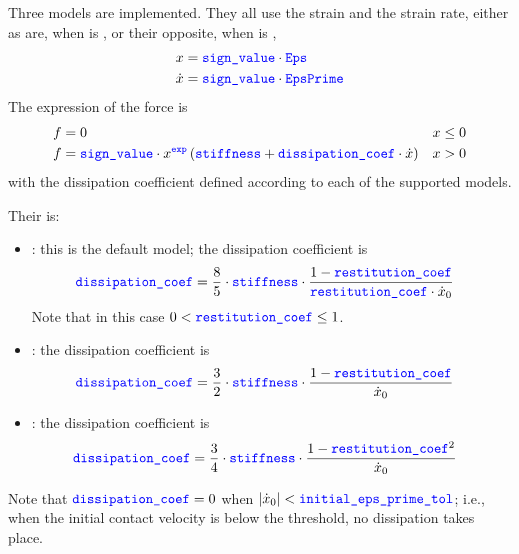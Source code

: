 Three models are implemented. They all use the strain and the strain rate, either as are, when  is ,
or their opposite, when  is ,
\begin{subequations}
\begin{align}
	x &= \textcolor{blue}{\texttt{sign\_value}} \cdot \textcolor{blue}{\texttt{Eps}}
	\\
	\dot{x} &= \textcolor{blue}{\texttt{sign\_value}} \cdot \textcolor{blue}{\texttt{EpsPrime}}
\end{align}
\end{subequations}
The expression of the force is
\begin{subequations}
\begin{align}
	f &= 0 && \text{$x \le 0$}
	\\
	f &= \textcolor{blue}{\texttt{sign\_value}} \cdot  x^{\textcolor{blue}{\texttt{exp}}} \left(  \textcolor{blue}{\texttt{stiffness}} + \textcolor{blue}{\texttt{dissipation\_coef}} \cdot \dot{x} \right) && \text{$x > 0$}
\end{align}
\end{subequations}
with the dissipation coefficient  defined according to each of the supported models.

Their  is:
\begin{itemize}
\item {} \cite{FLORES-2011-MUBO}: this is the default model; the dissipation coefficient is
\begin{align}
	\textcolor{blue}{\texttt{dissipation\_coef}} &= \frac{8}{5} \cdot \textcolor{blue}{\texttt{stiffness}} \cdot \frac{1 - \textcolor{blue}{\texttt{restitution\_coef}}}{\textcolor{blue}{\texttt{restitution\_coef}} \cdot \dot{x}_0}
\end{align}
Note that in this case $0 < \textcolor{blue}{\texttt{restitution\_coef}} \le 1$.

\item {} \cite{HUNT-1975}: the dissipation coefficient is
\begin{align}
	\textcolor{blue}{\texttt{dissipation\_coef}} &= \frac{3}{2} \cdot \textcolor{blue}{\texttt{stiffness}} \cdot \frac{1 - \textcolor{blue}{\texttt{restitution\_coef}}}{\dot{x}_0}
\end{align}

\item {} \cite{LANKARANI-1994-ND}: the dissipation coefficient is
\begin{align}
	\textcolor{blue}{\texttt{dissipation\_coef}} &= \frac{3}{4} \cdot \textcolor{blue}{\texttt{stiffness}} \cdot \frac{1 - \textcolor{blue}{\texttt{restitution\_coef}}^2}{\dot{x}_0}
\end{align}
\end{itemize}
Note that $\textcolor{blue}{\texttt{dissipation\_coef}} = 0$ when $|\dot{x}_0| < \textcolor{blue}{\texttt{initial\_eps\_prime\_tol}}$;
i.e., when the initial contact velocity is below the threshold, no dissipation takes place.


